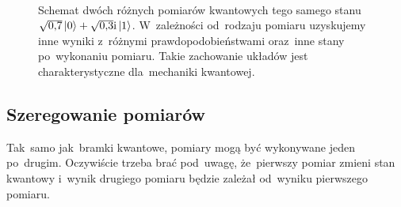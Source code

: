 \begin{figure}
	\centering
	\\
	\caption{Schemat dwóch różnych pomiarów kwantowych tego samego stanu
		$\sqrt{0{,}7}\ket{0}+\sqrt{0{,}3}{\mathrm i}\ket{1}$. W~zależności od~rodzaju pomiaru
		uzyskujemy inne wyniki z~różnymi prawdopodobieństwami oraz~inne stany
		po~wykonaniu pomiaru.
		Takie zachowanie układów jest charakterystyczne dla~mechaniki kwantowej.
	}
	\label{rys:pomiar}
\end{figure}


\subsection{Szeregowanie pomiarów}
Tak~samo jak~bramki kwantowe, pomiary mogą być wykonywane jeden po~drugim.
Oczywiście trzeba brać pod~uwagę, że~pierwszy pomiar zmieni stan kwantowy
i~wynik drugiego pomiaru będzie zależał od~wyniku pierwszego pomiaru.

